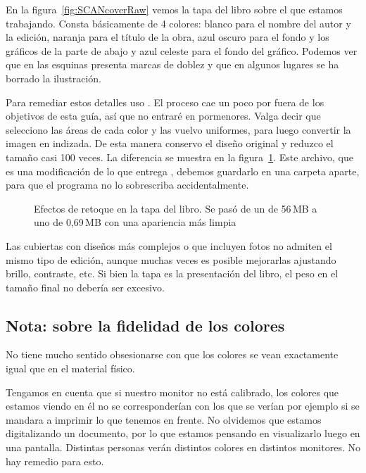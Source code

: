 \documentclass[%
	a5paper,
	10pt,
	twoside,
	openright,
	final,
]{memoir}
\begin{document}
	En la figura~\ref{fig:SCANcoverRaw} vemos la tapa del libro sobre el que estamos trabajando. Consta básicamente de 4 colores: blanco para el nombre del autor y la edición, naranja para el título de la obra, azul oscuro para el fondo y los gráficos de la parte de abajo y azul celeste para el fondo del gráfico. Podemos ver que en las esquinas presenta marcas de doblez y que en algunos lugares se ha borrado la ilustración.

	Para remediar estos detalles uso \gimp. El proceso cae un poco por fuera de los objetivos de esta guía, así que no entraré en pormenores. Valga decir que selecciono las áreas de cada color y las vuelvo uniformes, para luego convertir la imagen en indizada. De esta manera conservo el diseño original y reduzco el tamaño casi 100 veces. La diferencia se muestra en la figura~\ref{fig:SCANcover}. Este archivo, que es una modificación de lo que entrega \scantailor, debemos guardarlo en una carpeta aparte, para que el programa no lo sobrescriba accidentalmente.

	\begin{figure}
		\centering
		\hfill
		\caption[Efectos de retoque en la tapa del libro]{Efectos de retoque en la tapa del libro. Se pasó de un \tiff de 56\,MB a uno de 0,69\,MB con una apariencia más limpia\label{fig:SCANcover}}
	\end{figure}

	Las cubiertas con diseños más complejos o que incluyen fotos no admiten el mismo tipo de edición, aunque muchas veces es posible mejorarlas ajustando brillo, contraste, etc. Si bien la tapa es la presentación del libro, el peso en el tamaño final no debería ser excesivo.

	\subsection{Nota: sobre la fidelidad de los colores} No tiene mucho sentido obsesionarse con que los colores se vean exactamente igual que en el material físico.

	Tengamos en cuenta que si nuestro monitor no está calibrado, los colores que estamos viendo en él no se corresponderían con los que se verían por ejemplo si se mandara a imprimir lo que tenemos en frente. No olvidemos que estamos digitalizando un documento, por lo que estamos pensando en visualizarlo luego en una pantalla. Distintas personas verán distintos colores en distintos monitores. No hay remedio para esto.
\end{document}
